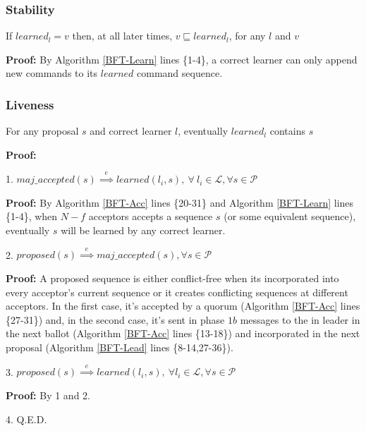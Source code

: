 \subsubsection{Stability}
\begin{theorem}
If $learned_l = v$ then, at all later times, $v \sqsubseteq learned_l$, for any $l$ and $v$ \par \label{S-T1}
\end{theorem} 
\textbf{Proof:} By Algorithm \ref{BFT-Learn} lines \{1-4\}, a correct learner can only append new commands to its $learned$ command sequence.

\subsubsection{Liveness}
\begin{theorem}
For any proposal $s$ and correct learner $l$, eventually $learned_l$ contains $s$ \label{L-T1} \par
\end{theorem} 
\textbf{Proof:} \par
1. $maj\_accepted(s) \overset{e}{\implies} learned(l_i,s),\ \forall\ l_i \in \mathcal{L},\forall s \in \mathcal{P}$ \par
\indent\indent\parbox{\linewidth}{\textbf{Proof:} By Algorithm \ref{BFT-Acc} lines \{20-31\} and Algorithm \ref{BFT-Learn} lines \{1-4\}, when $N-f$ acceptors accepts a sequence $s$ (or some equivalent sequence), eventually $s$ will be learned by any correct learner.}\par
2. $proposed(s) \overset{e}{\implies} maj\_accepted(s), \forall s \in \mathcal{P}$ \par
\indent\indent\parbox{\linewidth}{\textbf{Proof:} A proposed sequence is either conflict-free when its incorporated into every acceptor's current sequence or it creates conflicting sequences at different acceptors. In the first case, it's accepted by a quorum (Algorithm \ref{BFT-Acc} lines \{27-31\}) and, in the second case, it's sent in phase $1b$ messages to the in leader in the next ballot (Algorithm \ref{BFT-Acc} lines \{13-18\}) and incorporated in the next proposal (Algorithm \ref{BFT-Lead} lines \{8-14,27-36\}).} \par
3. $proposed(s) \overset{e}{\implies} learned(l_i,s),\ \forall l_i \in \mathcal{L}, \forall s \in \mathcal{P}$ \par
\indent\indent\textbf{Proof:} By 1 and 2. \par
4. Q.E.D.